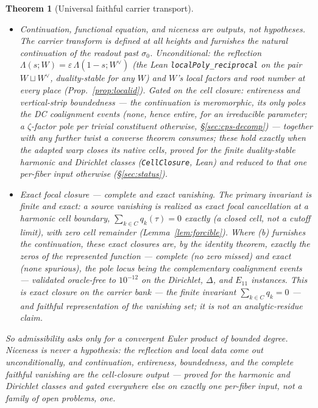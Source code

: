 \documentclass[11pt]{article}
\newtheorem{theorem}{Theorem}
\theoremstyle{definition}
\renewcommand{\Re}{\operatorname{Re}}
\begin{document}
\begin{theorem}[Universal faithful carrier transport]
\begin{itemize}
$\{\Re s>\sigma_0\}$; the growth/magnitude clock carries the coefficients $a_n(W)$ whatever their size, so no
Ramanujan bound is needed.
\item[\textup{(b)}] \emph{Continuation, functional equation, and niceness are outputs, not hypotheses.} The
carrier transform is defined at all heights and furnishes the natural continuation of the readout past
$\sigma_0$. \emph{Unconditional}: the reflection $\Lambda(s;W)=\varepsilon\,\Lambda(1-s;W^\vee)$ (the Lean
\texttt{localPoly\_reciprocal} on the pair $W\sqcup W^\vee$, duality-stable for any $W$) and $W$'s local factors
and root number at every place (Prop.~\ref{prop:localid}). \emph{Gated on the cell closure}: entireness and
vertical-strip boundedness --- the continuation is meromorphic, its only poles the DC coalignment events (none,
hence entire, for an irreducible parameter; a $\zeta$-factor pole per trivial constituent otherwise,
\S\ref{sec:cps-decomp}) --- together with any further twist a converse theorem consumes; these hold exactly when
the adapted warp closes its native cells, \emph{proved} for the finite duality-stable harmonic and Dirichlet
classes (\texttt{CellClosure}, Lean) and reduced to that \emph{one} per-fiber input otherwise (\S\ref{sec:status}).
\item[\textup{(c)}] \emph{Exact focal closure --- complete and exact vanishing.} The primary invariant is finite
and exact: a source vanishing is realized as \emph{exact focal cancellation} at a harmonic cell boundary,
$\sum_{k\in C}q_k(\tau)=0$ \emph{exactly} (a closed cell, not a cutoff limit), with zero cell remainder
(Lemma~\ref{lem:forcible}). Where \emph{(b)} furnishes the continuation, these exact closures are, by the identity
theorem, exactly the zeros of the represented function --- \emph{complete} (no zero missed) and \emph{exact} (none
spurious), the pole locus being the complementary coalignment events --- validated oracle-free to $10^{-12}$ on
the Dirichlet, $\Delta$, and $E_{11}$ instances. This is exact closure on the carrier bank --- the finite invariant
$\sum_{k\in C}q_k=0$ --- and faithful representation of the vanishing \emph{set}; it is not an analytic-residue
claim.
\end{itemize}
So admissibility asks only for a convergent Euler product of bounded degree. Niceness is never a hypothesis: the
reflection and local data come out unconditionally, and continuation, entireness, boundedness, and the complete
faithful vanishing are the cell-closure output --- proved for the harmonic and Dirichlet classes and gated
everywhere else on exactly one per-fiber input, not a family of open problems, one.
\end{theorem}
\end{document}
